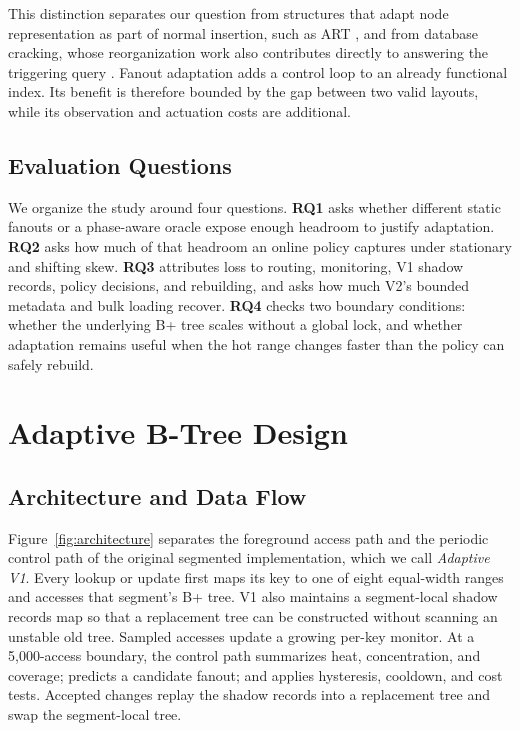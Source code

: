 \documentclass[sigconf,review,anonymous]{acmart}
\begin{document}
This distinction separates our question from structures that adapt node
representation as part of normal insertion, such as ART
\cite{leis2013adaptive}, and from database cracking, whose reorganization work
also contributes directly to answering the triggering query
\cite{idreos2007database}.  Fanout adaptation adds a control loop to an already
functional index.  Its benefit is therefore bounded by the gap between two
valid layouts, while its observation and actuation costs are additional.

\subsection{Evaluation Questions}

We organize the study around four questions.  \textbf{RQ1} asks whether
different static fanouts or a phase-aware oracle expose enough headroom to
justify adaptation.  \textbf{RQ2} asks how much of that headroom an online
policy captures under stationary and shifting skew.  \textbf{RQ3} attributes
loss to routing, monitoring, V1 shadow records, policy decisions, and
rebuilding, and asks how much V2's bounded metadata and bulk loading recover.
\textbf{RQ4} checks two boundary conditions: whether the underlying B+ tree
scales without a global lock, and whether adaptation remains useful when the
hot range changes faster than the policy can safely rebuild.

\section{Adaptive B-Tree Design}
\label{sec:design}

\subsection{Architecture and Data Flow}

Figure~\ref{fig:architecture} separates the foreground access path and the
periodic control path of the original segmented implementation, which we call
\emph{Adaptive V1}.  Every lookup or update first maps its key to one of eight
equal-width ranges and accesses that segment's B+ tree.  V1 also maintains a
segment-local shadow records map so that a replacement tree can be constructed
without scanning an unstable old tree.  Sampled accesses update a growing
per-key monitor.  At a 5,000-access boundary, the control path summarizes heat,
concentration, and coverage; predicts a candidate fanout; and applies
hysteresis, cooldown, and cost tests.  Accepted changes replay the shadow
records into a replacement tree and swap the segment-local tree.
\end{document}
